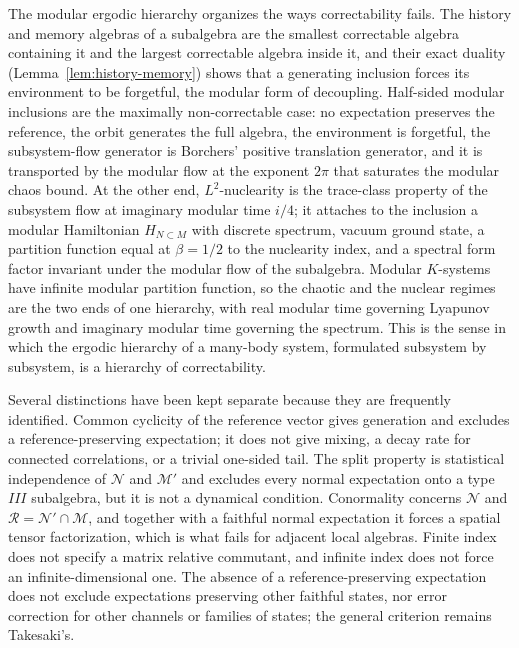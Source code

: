 \documentclass[a4paper,11pt]{article}
\theoremstyle{definition}
\begin{document}
The modular ergodic hierarchy organizes the ways correctability fails. The history and memory algebras of a subalgebra are the smallest correctable algebra containing it and the largest correctable algebra inside it, and their exact duality (Lemma~\ref{lem:history-memory}) shows that a generating inclusion forces its environment to be forgetful, the modular form of decoupling. Half-sided modular inclusions are the maximally non-correctable case: no expectation preserves the reference, the orbit generates the full algebra, the environment is forgetful, the subsystem-flow generator is Borchers' positive translation generator, and it is transported by the modular flow at the exponent $2\pi$ that saturates the modular chaos bound. At the other end, $L^2$-nuclearity is the trace-class property of the subsystem flow at imaginary modular time $i/4$; it attaches to the inclusion a modular Hamiltonian $H_{N\subset M}$ with discrete spectrum, vacuum ground state, a partition function equal at $\beta=1/2$ to the nuclearity index, and a spectral form factor invariant under the modular flow of the subalgebra. Modular $K$-systems have infinite modular partition function, so the chaotic and the nuclear regimes are the two ends of one hierarchy, with real modular time governing Lyapunov growth and imaginary modular time governing the spectrum. This is the sense in which the ergodic hierarchy of a many-body system, formulated subsystem by subsystem, is a hierarchy of correctability.

Several distinctions have been kept separate because they are frequently identified. Common cyclicity of the reference vector gives generation and excludes a reference-preserving expectation; it does not give mixing, a decay rate for connected correlations, or a trivial one-sided tail. The split property is statistical independence of $\mathcal N$ and $\mathcal M'$ and excludes every normal expectation onto a type $III$ subalgebra, but it is not a dynamical condition. Conormality concerns $\mathcal N$ and $\mathcal R=\mathcal N'\cap\mathcal M$, and together with a faithful normal expectation it forces a spatial tensor factorization, which is what fails for adjacent local algebras. Finite index does not specify a matrix relative commutant, and infinite index does not force an infinite-dimensional one. The absence of a reference-preserving expectation does not exclude expectations preserving other faithful states, nor error correction for other channels or families of states; the general criterion remains Takesaki's.
\end{document}
